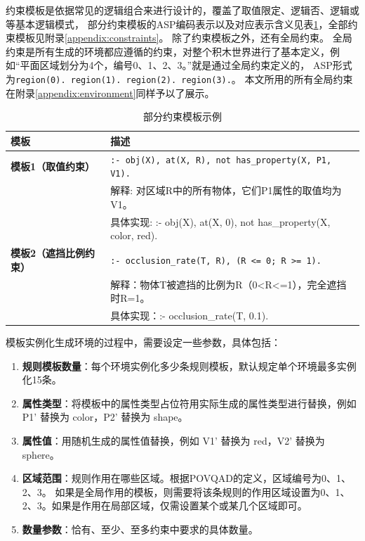 约束模板是依据常见的逻辑组合来进行设计的，覆盖了取值限定、逻辑否、逻辑或等基本逻辑模式，
部分约束模板的ASP编码表示以及对应表示含义见表\ref{tab:asp_templates}，全部约束模板见附录\ref{appendix:constraints}。
除了约束模板之外，还有全局约束。
全局约束是所有生成的环境都应遵循的约束，对整个积木世界进行了基本定义，例如“平面区域划分为4个，编号0、1、2、3。”就是通过全局约束定义的，
ASP形式为\texttt{region(0). region(1). region(2). region(3).}。
本文所用的所有全局约束在附录\ref{appendix:environment}同样予以了展示。
\begin{table}[h]
    \centering
    \renewcommand{\arraystretch}{1.0}
    \begin{tabular}{|p{2.8cm}|p{12.2cm}|}
        \hline
        \textbf{模板} & \textbf{描述} \\
        \hline
        \textbf{模板1（取值约束）} & 
        \texttt{:- obj(X), at(X, R), not has\_property(X, P1, V1).} \\ 
        & 解释: 对区域R中的所有物体，它们P1属性的取值均为V1。 \\ 
        & 具体实现: :- obj(X), at(X, 0), not has\_property(X, color, red). \\
        \hline
        \textbf{模板2（遮挡比例约束）} & 
        \texttt{:- occlusion\_rate(T, R), (R <= 0; R >= 1).} \\ 
        & 解释：物体T被遮挡的比例为R（0<R<=1），完全遮挡时R=1。 \\ 
        & 具体实现：:- occlusion\_rate(T, 0.1). \\
        \hline
    \end{tabular}
    \caption{部分约束模板示例}
    \label{tab:asp_templates}
\end{table}

模板实例化生成环境的过程中，需要设定一些参数，具体包括：
\begin{enumerate}[nosep]
\item \textbf{规则模板数量}：每个环境实例化多少条规则模板，默认规定单个环境最多实例化15条。
\item \textbf{属性类型}：将模板中的属性类型占位符用实际生成的属性类型进行替换，例如 P1' 替换为 color，P2' 替换为 shape。
\item \textbf{属性值}：用随机生成的属性值替换，例如 V1' 替换为 red，V2' 替换为 sphere。
\item \textbf{区域范围}：规则作用在哪些区域。根据POVQAD的定义，区域编号为0、1、2、3。
如果是全局作用的模板，则需要将该条规则的作用区域设置为0、1、2、3。如果是作用在局部区域，仅需设置某个或某几个区域即可。
\item \textbf{数量参数}：恰有、至少、至多约束中要求的具体数量。
\end{enumerate}

